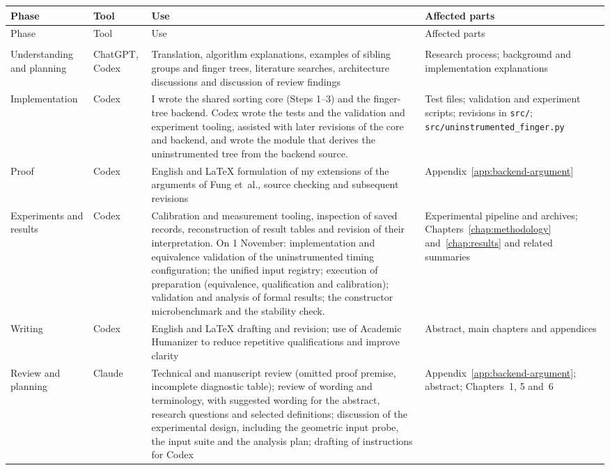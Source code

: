 \begingroup
\small
{}
\setlength{\tabcolsep}{4pt}
\renewcommand{\arraystretch}{1.2}
\begin{longtable}{@{}>{\raggedright\arraybackslash}p{}>{\raggedright\arraybackslash}p{}>{\raggedright\arraybackslash}p{}>{\raggedright\arraybackslash}p{}@{}}
\toprule
Phase & Tool & Use & Affected parts\\
\midrule
\endfirsthead
\toprule
Phase & Tool & Use & Affected parts\\
\midrule
\endhead
\midrule
\multicolumn{4}{r}{\textit{Continued on the next page}}\\
\endfoot
\bottomrule
\endlastfoot
Understanding and planning & ChatGPT, Codex & Translation, algorithm explanations, examples of sibling groups and finger trees, literature searches, architecture discussions and discussion of review findings & Research process; background and implementation explanations\\
\addlinespace
Implementation & Codex & I wrote the shared sorting core (Steps 1--3) and the finger-tree backend. Codex wrote the tests and the validation and experiment tooling, assisted with later revisions of the core and backend, and wrote the module that derives the uninstrumented tree from the backend source. & Test files; validation and experiment scripts; revisions in \texttt{src/}; \texttt{src/\allowbreak uninstrumented\_\allowbreak finger.py}\\
\addlinespace
Proof & Codex & English and LaTeX formulation of my extensions of the arguments of Fung et~al., source checking and subsequent revisions & Appendix~\ref{app:backend-argument}\\
\addlinespace
Experiments and results & Codex & Calibration and measurement tooling, inspection of saved records, reconstruction of result tables and revision of their interpretation. On 1 November: implementation and equivalence validation of the uninstrumented timing configuration; the unified input registry; execution of preparation (equivalence, qualification and calibration); validation and analysis of formal results; the constructor microbenchmark and the stability check. & Experimental pipeline and archives; Chapters~\ref{chap:methodology} and~\ref{chap:results} and related summaries\\
\addlinespace
Writing & Codex & English and LaTeX drafting and revision; use of Academic Humanizer to reduce repetitive qualifications and improve clarity & Abstract, main chapters and appendices\\
\addlinespace
Review and planning & Claude & Technical and manuscript review (omitted proof premise, incomplete diagnostic table); review of wording and terminology, with suggested wording for the abstract, research questions and selected definitions; discussion of the experimental design, including the geometric input probe, the input suite and the analysis plan; drafting of instructions for Codex & Appendix~\ref{app:backend-argument}; abstract; Chapters~1, 5 and~6\\
\end{longtable}
\endgroup

